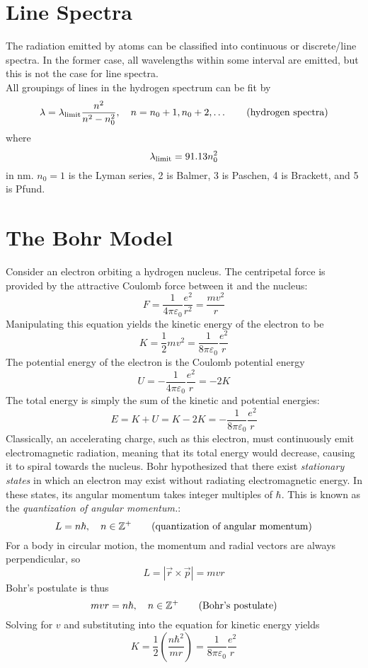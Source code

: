 \documentclass{subfiles}
\begin{document}
	\section{Line Spectra}
		The radiation emitted by atoms can be classified into continuous or discrete/line spectra. In the former case, all wavelengths within some interval are emitted, but this is not the case for line spectra. \\
		All groupings of lines in the hydrogen spectrum can be fit by
			\[
				\lambda = \lambda_{\text{limit}}\frac{n^2}{n^2 - n_0^2}, \quad 
				n = n_0 + 1, n_0 + 2, \ldots
					\tag{hydrogen spectra}	
			\]
			where
			\[\lambda_{\text{limit}} = 91.13n_0^2\]
			in nm.
			\(n_0 = 1\) is the Lyman series, 2 is Balmer, 3 is Paschen, 4 is Brackett, and 5 is Pfund.
	\section{The Bohr Model}
		Consider an electron orbiting a hydrogen nucleus. The centripetal force is provided by the attractive Coulomb force between it and the nucleus:
			\[
				F = \frac{1}{4\pi\varepsilon_0}\frac{e^2}{r^2}
					= \frac{mv^2}{r}
			\]
			Manipulating this equation yields the kinetic energy of the electron to be
			\[
				K = \frac{1}{2}mv^2
					= \frac{1}{8\pi\varepsilon_0}\frac{e^2}{r}
			\]
			The potential energy of the electron is the Coulomb potential energy
			\[
				U = -\frac{1}{4\pi\varepsilon_0}\frac{e^2}{r}
					= -2K
			\]
			The total energy is simply the sum of the kinetic and potential energies:
			\[
				E = K + U
					= K - 2K
					= -\frac{1}{8\pi\varepsilon_0}\frac{e^2}{r}
			\]
			Classically, an accelerating charge, such as this electron, must continuously emit electromagnetic radiation, meaning that its total energy would decrease, causing it to spiral towards the nucleus. Bohr hypothesized that there exist \textit{stationary states} in which an electron may exist without radiating electromagnetic energy. In these states, its angular momentum takes integer multiples of \(\hbar\). This is known as the \textit{quantization of angular momentum.}:
			\[
				L = n\hbar
					, \quad n \in \mathbb{Z}^+
					\tag{quantization of angular momentum}
			\]
			For a body in circular motion, the momentum and radial vectors are always perpendicular, so
			\[
				L = |\vec{r} \times \vec{p}| = mvr
			\]
			Bohr's postulate is thus
			\[
				mvr = n\hbar
					, \quad n \in \mathbb{Z}^+
					\tag{Bohr's postulate}
			\]
			Solving for \(v\) and substituting into the equation for kinetic energy yields
			\[
				K = \frac{1}{2}\left(\frac{n\hbar^2}{mr}\right)
					= \frac{1}{8\pi\varepsilon_0}\frac{e^2}{r}
			\]
\end{document}
